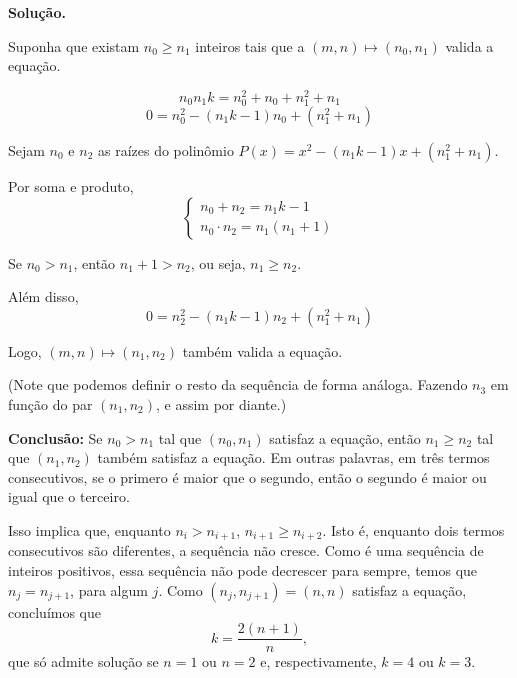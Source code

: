 \documentclass[10pt, a4paper]{article}
\begin{document}



	
	




	\textbf{Solução.}

	Suponha que existam $n_0 \ge n_1$ inteiros tais que a $(m, n) \mapsto (n_0, n_1)$ valida a equação.

	\[n_0n_1k = n_0^2 + n_0 + n_1^2 + n_1\]
	\[0 = n_0^2 - (n_1k - 1)n_0 + (n_1^2 + n_1)\]
	
	Sejam $n_0$ e $n_2$ as raízes do polinômio $P(x) = x^2 - (n_1k-1)x + (n_1^2 + n_1)$.

	Por soma e produto, \[ \begin{cases} n_0 + n_2 = n_1k - 1 \\ n_0 \cdot n_2 = n_1(n_1+1) \end{cases}\]

	Se $n_0 > n_1$, então $n_1 + 1 > n_2$, ou seja, $n_1 \ge n_2$.
	
	Além disso, \[0 = n_2^2 - (n_1k - 1)n_2 + (n_1^2 + n_1)\]

	Logo, $(m, n) \mapsto (n_1, n_2)$ também valida a equação.

	(Note que podemos definir o resto da sequência de forma análoga. Fazendo $n_3$ em função do par $(n_1, n_2)$, e assim por diante.)

	\textbf{Conclusão:} Se $n_0 > n_1$ tal que $(n_0, n_1)$ satisfaz a equação, então $n_1 \ge n_2$ tal que $(n_1, n_2)$ também satisfaz a equação. Em outras palavras, em três termos consecutivos, se o primero é maior que o segundo, então o segundo é maior ou igual que o terceiro.

	Isso implica que, enquanto $n_i > n_{i+1}$, $n_{i+1} \ge n_{i+2}$. Isto é, enquanto dois termos consecutivos são diferentes, a sequência não cresce. Como é uma sequência de inteiros positivos, essa sequência não pode decrescer para sempre, temos que $n_j = n_{j+1}$, para algum $j$. Como $(n_j, n_{j+1}) = (n, n)$ satisfaz a equação, concluímos que \[ k = \frac{2(n+1)}{n}, \]
	que só admite solução se $n = 1$ ou $n = 2$ e, respectivamente, $k = 4$ ou $k = 3$.  
\end{document}
